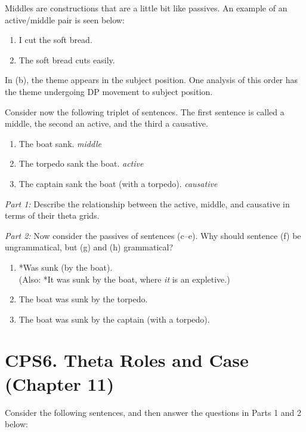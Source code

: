 ﻿\documentclass[11pt]{article}
\begin{document}
Middles are constructions that are a little bit like passives. An example of an active/middle pair is seen below:

\begin{enumerate}
  \item[a)] I cut the soft bread.
  \item[b)] The soft bread cuts easily.
\end{enumerate}

In (b), the theme appears in the subject position. One analysis of this order has the theme undergoing DP movement to subject position.

Consider now the following triplet of sentences. The first sentence is called a middle, the second an active, and the third a causative.

\begin{enumerate}
  \item[c)] The boat sank. \hfill \textit{middle}
  \item[d)] The torpedo sank the boat. \hfill \textit{active}
  \item[e)] The captain sank the boat (with a torpedo). \hfill \textit{causative}
\end{enumerate}

\vspace{3em}
\textit{Part 1:} Describe the relationship between the active, middle, and causative in terms of their theta grids.

\vspace{5em}
\textit{Part 2:} Now consider the passives of sentences (c--e). Why should sentence (f) be ungrammatical, but (g) and (h) grammatical?

\begin{enumerate}
  \item[(f)] *Was sunk (by the boat).\\
  (Also: *It was sunk by the boat, where \textit{it} is an expletive.)
  \item[(g)] The boat was sunk by the torpedo.
  \item[(h)] The boat was sunk by the captain (with a torpedo).
\end{enumerate}
\vspace{3em}
\newpage
\section*{CPS6. Theta Roles and Case (Chapter 11)}

Consider the following sentences, and then answer the questions in Parts 1 and 2 below:
\end{document}
